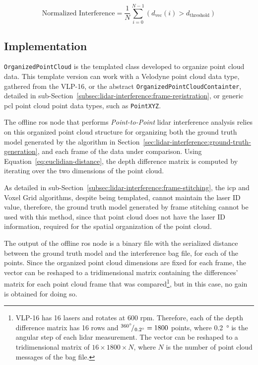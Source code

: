 \begin{equation}
\label{eq:normalized-interference-depth}
\displaystyle
\text{Normalized Interference} = \frac{1}{N} \sum\limits^{N-1}_{i = 0} \left(d_{\text{vec}}(i)
> d_\text{threshold}\right)
\end{equation}

\subsection{Implementation}
\texttt{OrganizedPointCloud} is the templated class developed to organize point cloud data. This template version can work with a Velodyne point cloud data type, gathered from the VLP-16, or the abstract \texttt{OrganizedPointCloudContainter}, detailed in sub-Section~\ref{subsec:lidar-interference:frame-registration}, or generic \ac{pcl} point cloud point data types, such as \texttt{PointXYZ}.

The offline \ac{ros} node that performs \textit{Point-to-Point} \ac{lidar} interference analysis relies on this organized point cloud structure for organizing both the ground truth model generated by the algorithm in Section~\ref{sec:lidar-interference:ground-truth-generation}, and each frame of the data under comparison. Using Equation~\eqref{eq:euclidian-distance}, the depth difference matrix is computed by iterating over the two dimensions of the point cloud. 

As detailed in sub-Section~\ref{subsec:lidar-interference:frame-stitching}, the \ac{icp} and Voxel Grid algorithms, despite being templated, cannot maintain the \ac{laser} ID value, therefore, the ground truth model generated by frame stitching cannot be used with this method, since that point cloud does not have the \ac{laser} ID information, required for the spatial organization of the point cloud.

The output of the offline \ac{ros} node is a binary file with the serialized distance between the ground truth model and the interference bag file, for each of the points. Since the organized point cloud dimensions are fixed for each frame, the vector can be reshaped to a tridimensional matrix containing the differences' matrix for each point cloud frame that was compared\footnote{VLP-16 has 16 lasers and rotates at 600 \ac{rpm}. Therefore, each of the depth difference matrix has 16 rows and ${}^{\SI{360}{\degree}}\!/_{\SI{0.2}{\degree}} = 1800$ points, where \SI{0.2}{\degree} is the angular step of each \ac{lidar} measurement. The vector can be reshaped to a tridimensional matrix of $16\times 1800\times N$, where $N$ is the number of point cloud messages of the bag file.}, but in this case, no gain is obtained for doing so.

